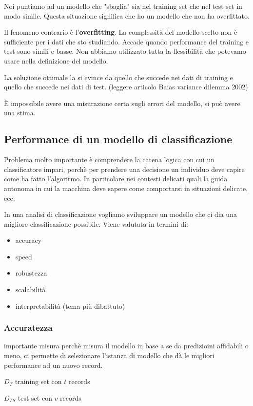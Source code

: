 Noi puntiamo ad un modello che "sbaglia" sia nel training set che nel test set in modo simile. Questa situazione significa che ho un modello che non ha overfittato. 

Il fenomeno contrario \`e l'\textbf{overfitting}. La complessit\`a del modello scelto non \`e sufficiente per i dati che sto studiando. Accade quando performance del training e test sono simili e basse. Non abbiamo utilizzato tutta la flessibilit\`a che potevamo usare nella definizione del modello.

La soluzione ottimale la si evince da quello che succede nei dati di training e quello che succede nei dati di test. (leggere articolo Baias variance dilemma 2002)

\`E impossibile avere una misurazione certa sugli errori del modello, si pu\`o avere una stima. 

\subsection{Performance di un modello di classificazione}
Problema molto importante \`e comprendere la catena logica con cui un classificatore impari, perch\`e per prendere una decisione un individuo deve capire come ha fatto l'algoritmo. In particolare nei contesti delicati quali la guida autonoma in cui la macchina deve sapere come comportarsi in situazioni delicate, ecc. 

In una analisi di classificazione vogliamo sviluppare un modello che ci dia una migliore classificazione possibile. Viene valutata in termini di:
\begin{itemize}
	\item accuracy
	\item speed
	\item robustezza
	\item scalabilit\`a
	\item interpretabilit\`a (tema pi\`u dibattuto)
\end{itemize}

\subsubsection{Accuratezza}
importante misura perch\`e misura il modello in base a se da predizioini affidabili o meno, ci permette di selezionare l'istanza di modello che d\`a le migliori performance ad un nuovo record.

$D_T$ training set con $t$ records

$D_{TS}$ test set con $v$ records


